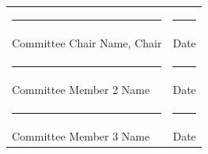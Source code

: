 \begin{titlepage}
\begin{center}
    \begin{tabular}{ll}
        \rule{3.5in}{0.4pt} & \rule{1.5in}{0.4pt} \\
        Committee Chair Name, Chair & Date \\[0.4in]
        \rule{3.5in}{0.4pt} & \rule{1.5in}{0.4pt} \\
        Committee Member 2 Name & Date \\[0.4in]
        \rule{3.5in}{0.4pt} & \rule{1.5in}{0.4pt} \\
        Committee Member 3 Name & Date \\
    \end{tabular}
    
    \vspace{0.4in}
\end{center}
\end{titlepage}
